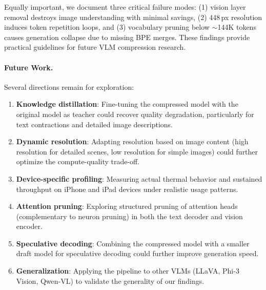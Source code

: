 \documentclass[11pt]{article}
\begin{document}
Equally important, we document three critical failure modes: (1) vision layer removal destroys image understanding with minimal savings, (2) 448\,px resolution induces token repetition loops, and (3) vocabulary pruning below $\sim$144K tokens causes generation collapse due to missing BPE merges. These findings provide practical guidelines for future VLM compression research.

\paragraph{Future Work.} Several directions remain for exploration:

\begin{enumerate}[leftmargin=*]
    \item \textbf{Knowledge distillation}: Fine-tuning the compressed model with the original model as teacher could recover quality degradation, particularly for text contractions and detailed image descriptions.
    \item \textbf{Dynamic resolution}: Adapting resolution based on image content (high resolution for detailed scenes, low resolution for simple images) could further optimize the compute-quality trade-off.
    \item \textbf{Device-specific profiling}: Measuring actual thermal behavior and sustained throughput on iPhone and iPad devices under realistic usage patterns.
    \item \textbf{Attention pruning}: Exploring structured pruning of attention heads (complementary to neuron pruning) in both the text decoder and vision encoder.
    \item \textbf{Speculative decoding}: Combining the compressed model with a smaller draft model for speculative decoding could further improve generation speed.
    \item \textbf{Generalization}: Applying the pipeline to other VLMs (LLaVA, Phi-3 Vision, Qwen-VL) to validate the generality of our findings.
\end{enumerate}


\end{document}
